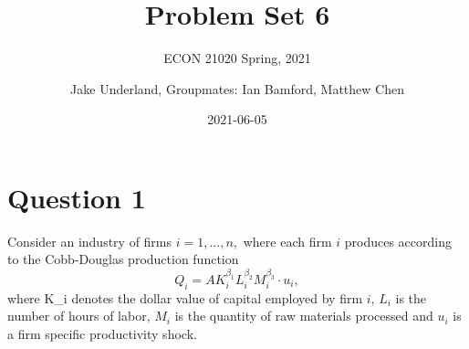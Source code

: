\documentclass[
]{article}
\title{Problem Set 6}
\subtitle{ECON 21020 Spring, 2021}
\author{Jake Underland, Groupmates: Ian Bamford, Matthew Chen}
\date{2021-06-05}
\begin{document}
\maketitle

{
\setcounter{tocdepth}{1}
\tableofcontents
}
\hypertarget{question-1}{%
\section{Question 1}\label{question-1}}

Consider an industry of firms \(i = 1,...,n,\) where each firm \(i\)
produces according to the Cobb-Douglas production function
\[Q_i = AK_i^{\beta_1}L_i^{\beta_2}M_i^{\beta_3}\cdot u_i,\] where K\_i
denotes the dollar value of capital employed by firm \(i\), \(L_i\) is
the number of hours of labor, \(M_i\) is the quantity of raw materials
processed and \(u_i\) is a firm specific productivity shock.
\end{document}
